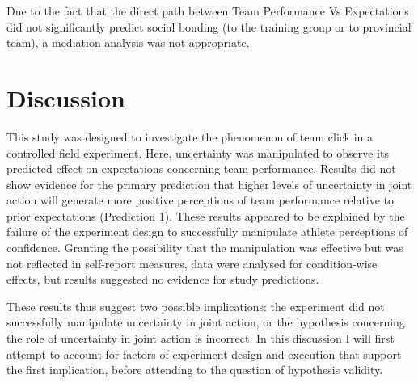 \begin{CJK}{UTF8}{gbsn}
Due to the fact that the direct path between Team Performance Vs Expectations did not significantly predict social bonding (to the training group or to provincial team), a mediation analysis was not appropriate.




































\clearpage
\section{Discussion\label{sect:discussionTrain}}
This study was designed to investigate the phenomenon of team click in a controlled field experiment. Here, uncertainty was manipulated   to observe its predicted effect on expectations concerning team performance.  Results did not show evidence for the primary prediction that higher levels of uncertainty in joint action will generate more positive perceptions of team performance relative to prior expectations (Prediction 1).  These results appeared to be explained by the failure of the experiment design to successfully manipulate athlete perceptions of confidence.  Granting the possibility that the manipulation was effective but was not reflected in self-report measures, data were analysed for condition-wise effects, but results suggested no evidence for study predictions.

These results thus suggest two possible implications: the experiment did not successfully manipulate uncertainty in joint action, or the hypothesis concerning the role of uncertainty in joint action is incorrect.  In this discussion I will first attempt to account for factors of experiment design and execution that support the first implication, before attending to the question of hypothesis validity.



\end{CJK}
